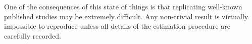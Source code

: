 One of the consequences of this state of things is that replicating
well-known published studies may be extremely difficult. Any
non-trivial result is virtually impossible to reproduce unless all
details of the estimation procedure are carefully recorded.

